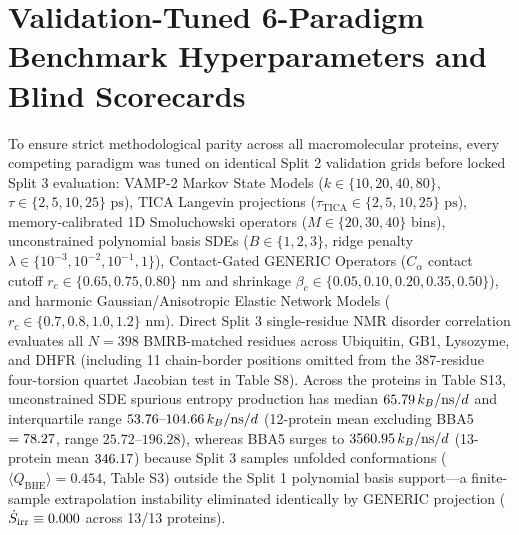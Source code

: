 \documentclass[10pt,letterpaper]{article}
\begin{document}
\clearpage
\section{Validation-Tuned 6-Paradigm Benchmark Hyperparameters and Blind Scorecards}

To ensure strict methodological parity across all \vFourNumProteins{} macromolecular proteins, every competing paradigm was tuned on identical Split 2 validation grids before locked Split 3 evaluation: VAMP-2 Markov State Models ($k \in \{10, 20, 40, 80\}$, $\tau \in \{2, 5, 10, 25\}\text{ ps}$), TICA Langevin projections ($\tau_{\mathrm{TICA}} \in \{2, 5, 10, 25\}\text{ ps}$), memory-calibrated 1D Smoluchowski operators ($M \in \{20, 30, 40\}$ bins), unconstrained polynomial basis SDEs ($B \in \{1, 2, 3\}$, ridge penalty $\lambda \in \{10^{-3}, 10^{-2}, 10^{-1}, 1\}$), Contact-Gated GENERIC Operators ($C_\alpha$ contact cutoff $r_c \in \{0.65, 0.75, 0.80\}\text{ nm}$ and shrinkage $\beta_c \in \{0.05, 0.10, 0.20, 0.35, 0.50\}$), and harmonic Gaussian/Anisotropic Elastic Network Models ($r_c \in \{0.7, 0.8, 1.0, 1.2\}\text{ nm}$). Direct Split 3 single-residue NMR disorder correlation evaluates all $N = 398$ BMRB-matched residues across Ubiquitin, GB1, Lysozyme, and DHFR (including 11 chain-border positions omitted from the 387-residue four-torsion quartet Jacobian test in Table S8). Across the \vFourNumProteins{} proteins in Table S13, unconstrained SDE spurious entropy production has median $65.79{}\,k_B/\text{ns}/d$ and interquartile range $53.76{}\text{--}104.66{}\,k_B/\text{ns}/d$ (12-protein mean excluding BBA5 $= 78.27{}$, range $25.72\text{--}196.28$), whereas BBA5 surges to $3560.95{}\,k_B/\text{ns}/d$ (13-protein mean $346.17{}$) because Split 3 samples unfolded conformations ($\langle Q_{\mathrm{BHE}}\rangle = 0.454$, Table S3) outside the Split 1 polynomial basis support---a finite-sample extrapolation instability eliminated identically by GENERIC projection ($\dot{S}_{\mathrm{irr}} \equiv 0.000{}$ across 13/13 proteins).
\end{document}
